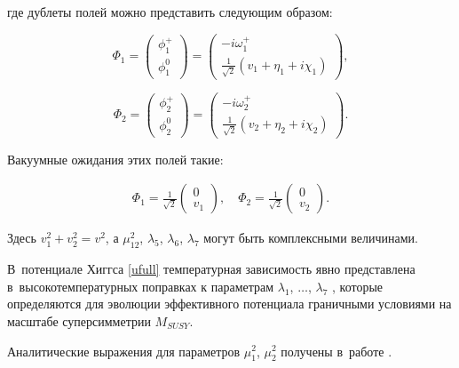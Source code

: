 где дублеты полей можно представить следующим образом:

$$

\Phi_{1} =\left(\begin{array}{l} {\phi _{1} ^{+} } \\ {\phi _{1} ^{0} } \end{array}\right)=\left(\begin{array}{l} {-i\omega _{1} ^{+} } \\ {\frac{1}{\sqrt{2} } (v_{1} +\eta _{1} +i\chi _{1} )} \end{array}\right),      $$

$$

\Phi_{2} =\left(\begin{array}{l} {\phi _{2} ^{+} } \\ {\phi _{2} ^{0} } \end{array}\right)=\left(\begin{array}{l} {-i\omega _{2} ^{+} } \\ {\frac{1}{\sqrt{2} } (v_{2} +\eta _{2} +i\chi _{2} )} \end{array}\right).

$$



Вакуумные ожидания этих полей такие:

\begin{eqnarray}

\Phi_{1} =\frac{1}{\sqrt{2} } \left(\begin{array}{c} {0} \\ v_{1}  \end{array}\right),

\quad 

\Phi_{2} =\frac{1}{\sqrt{2} } \left(\begin{array}{c} {0} \\ v_{2}  \end{array}\right).

\end{eqnarray}

Здесь $v_{1}^{2} +v_{2}^{2} =v^{2}$, а $\mu ^{2}_{12}$, $\lambda _{5}$, $\lambda _{6}$, $\lambda_{7}$ могут быть комплексными величинами.

В~потенциале Хиггса \eqref{ufull} температурная зависимость явно представлена в~высокотемпературных поправках к параметрам $\lambda_1$, $\dots$, $\lambda_7$ \cite{thres}, которые определяются для эволюции эффективного потенциала граничными условиями на масштабе суперсимметрии $M_{SUSY}$.

Аналитические выражения для параметров $\mu_1^2$, $\mu_2^2$ получены в~работе \cite{borisov}.



